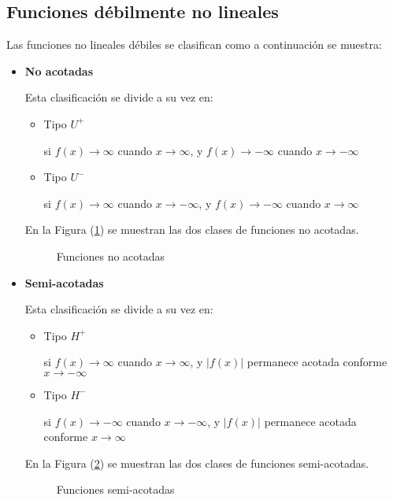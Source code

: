 \documentclass[conference,letterpaper,onecolumn]{IEEEtran}
\begin{document}
\subsection{Funciones d\'ebilmente no lineales}
Las funciones no lineales d\'ebiles se clasifican como a
continuaci\'on se muestra:
\begin{itemize}
\item {\bf No acotadas}\hfill\par
      Esta clasificaci\'on se divide a su vez en:
      \begin{itemize}
      \item Tipo $U^+$\hfill \par
	si $f(x)\to \infty$ cuando $x\to \infty$,
            y $f(x)\to -\infty$ cuando $x\to -\infty$
      \item Tipo $U^-$\hfill \par
	si $f(x)\to \infty$ cuando $x\to -\infty$,
            y $f(x)\to -\infty$ cuando $x\to \infty$      
      \end{itemize}
 
      En la Figura (\ref{UB}) se muestran las dos clases de funciones no acotadas.
      \begin{figure}[!h]
       \centerline{
       \epsfxsize=80mm
       }
       \caption{Funciones no acotadas}
       \label{UB}
      \end{figure}
\item {\bf Semi-acotadas}\hfill\par
      Esta clasificaci\'on se divide a su vez en:
      \begin{itemize}%
      \item Tipo $H^+$ \hfill \par
        si $f(x)\to \infty$ cuando $x\to \infty$,
        y $|f(x)|$ permanece acotada conforme $x\to -\infty$
      \item Tipo $H^-$\hfill\par
            si $f(x)\to -\infty$ cuando $x\to -\infty$,
            y $|f(x)|$ permanece acotada conforme $x\to \infty$
      \end{itemize} 
   En la Figura (\ref{HB}) se muestran las dos clases de funciones semi-acotadas.
      \begin{figure}[!h]
       \centerline{
       \epsfxsize=80mm
       }
       \caption{Funciones  semi-acotadas}
       \label{HB}
      \end{figure}



\end{itemize}
\end{document}
